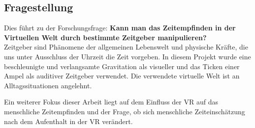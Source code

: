\documentclass{Paper}
\begin{document}
\subsection{Fragestellung}
Dies führt zu der Forschungsfrage: \textbf{Kann man das Zeitempfinden in der Virtuellen Welt durch bestimmte Zeitgeber manipulieren?}\\
Zeitgeber sind Phänomene der allgemeinen Lebenswelt und physische Kräfte, die uns unter Ausschluss der Uhrzeit die Zeit vorgeben.
In diesem Projekt wurde eine beschleunigte und verlangsamte Gravitation als visueller und das Ticken einer Ampel als auditiver Zeitgeber verwendet. Die verwendete virtuelle Welt ist an Alltagssituationen angelehnt.


Ein weiterer Fokus dieser Arbeit liegt auf dem Einfluss der VR auf das menschliche Zeitempfinden und der Frage, ob sich menschliche Zeiteinschätzung nach dem Aufenthalt in der VR verändert.  




\end{document}
